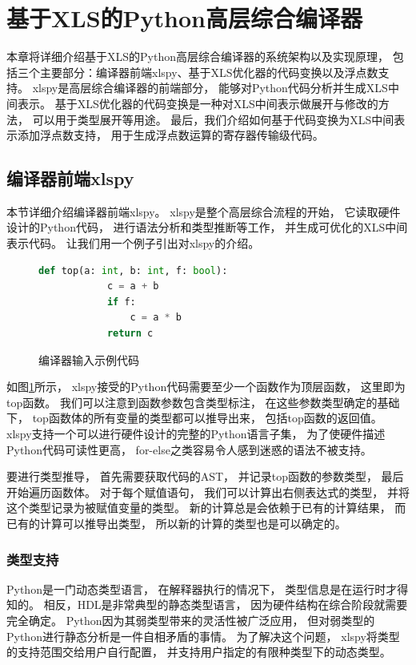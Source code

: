 \section{基于XLS的Python高层综合编译器}

本章将详细介绍基于XLS的Python高层综合编译器的系统架构以及实现原理，
包括三个主要部分：编译器前端xlspy、基于XLS优化器的代码变换以及浮点数支持。
xlspy是高层综合编译器的前端部分，
能够对Python代码分析并生成XLS中间表示。
基于XLS优化器的代码变换是一种对XLS中间表示做展开与修改的方法，
可以用于类型展开等用途。
最后，我们介绍如何基于代码变换为XLS中间表示添加浮点数支持，
用于生成浮点数运算的寄存器传输级代码。

\subsection{编译器前端xlspy}

本节详细介绍编译器前端xlspy。
xlspy是整个高层综合流程的开始，
它读取硬件设计的Python代码，
进行语法分析和类型推断等工作，
并生成可优化的XLS中间表示代码。
让我们用一个例子引出对xlspy的介绍。

\begin{figure}[h]
    \begin{lstlisting}[language=Python,frame=single]
        def top(a: int, b: int, f: bool):
            c = a + b
            if f:
                c = a * b
            return c
    \end{lstlisting}
    \caption{编译器输入示例代码}
    \label{code.1}
\end{figure}

如图\ref{code.1}所示，
xlspy接受的Python代码需要至少一个函数作为顶层函数，
这里即为top函数。
我们可以注意到函数参数包含类型标注，
在这些参数类型确定的基础下，
top函数体的所有变量的类型都可以推导出来，
包括top函数的返回值。
xlspy支持一个可以进行硬件设计的完整的Python语言子集，
为了使硬件描述Python代码可读性更高，
for-else之类容易令人感到迷惑的语法不被支持。

要进行类型推导，
首先需要获取代码的AST，
并记录top函数的参数类型，
最后开始遍历函数体。
对于每个赋值语句，
我们可以计算出右侧表达式的类型，
并将这个类型记录为被赋值变量的类型。
新的计算总是会依赖于已有的计算结果，
而已有的计算可以推导出类型，
所以新的计算的类型也是可以确定的。

\subsubsection{类型支持}

Python是一门动态类型语言，
在解释器执行的情况下，
类型信息是在运行时才得知的。
相反，HDL是非常典型的静态类型语言，
因为硬件结构在综合阶段就需要完全确定。
Python因为其弱类型带来的灵活性被广泛应用，
但对弱类型的Python进行静态分析是一件自相矛盾的事情。
为了解决这个问题，
xlspy将类型的支持范围交给用户自行配置，
并支持用户指定的有限种类型下的动态类型。

